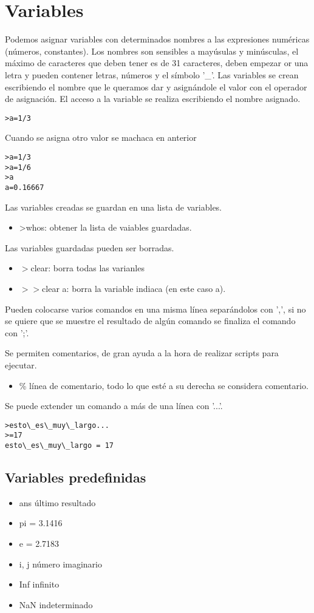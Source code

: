 \documentclass[a4,12pt]{article}
\begin{document}
\section{Variables}
Podemos asignar variables con determinados nombres a las expresiones numéricas (números, constantes). Los nombres son sensibles a mayúsulas y minúsculas, el máximo de caracteres que deben tener es de 31 caracteres, deben empezar or una letra y pueden contener letras, números y el símbolo '\_'. Las variables se crean escribiendo el nombre que le queramos dar y asignándole el valor con el operador de asignación. El acceso a la variable se realiza escribiendo el nombre asignado.
\begin{verbatim}
>a=1/3
\end{verbatim}
Cuando se asigna otro valor se machaca en anterior
\begin{verbatim}
>a=1/3
>a=1/6
>a
a=0.16667
\end{verbatim}
Las variables creadas se guardan en una lista de variables.
\begin{itemize}
\item>whos: obtener la lista de vaiables guardadas.
\end{itemize}
Las variables guardadas pueden ser borradas.
\begin{itemize}
\item$>$clear: borra todas las varianles
\item$>>$clear a: borra la variable indiaca (en este caso a).
\end{itemize}
Pueden colocarse varios comandos en una misma línea separándolos con ',', si no se quiere que se muestre el resultado de algún comando se finaliza el comando con ';'.

Se permiten comentarios, de gran ayuda a la hora de realizar scripts para ejecutar.
\begin{itemize}
\item\% línea de comentario, todo lo que esté a su derecha se considera comentario.
\end{itemize}
Se puede extender un comando a más de una línea con '...'.
\begin{verbatim}
>esto\_es\_muy\_largo...
>=17
esto\_es\_muy\_largo = 17
\end{verbatim}
\subsection{Variables predefinidas}
\begin{itemize}
\item ans último resultado
\item pi = 3.1416
\item e = 2.7183
\item i, j número imaginario
\item Inf infinito
\item NaN indeterminado
\end{itemize}
\end{document}
